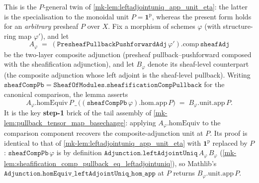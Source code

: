 \begin{lemma}\label{mk-lem:leftadjointuniq_app_unit_eta_general}
  \leanok

  This is the \(P\)-general twin of \ref{mk-lem:leftadjointuniq_app_unit_eta}: the latter is the
  specialisation to the monoidal unit \(P = \mathbf{1}^{\mathrm{p}}\), whereas the present form
  holds for an \emph{arbitrary} presheaf \(P\) over \(X\). Fix a morphism of schemes
  \(\varphi\) (with structure-ring map \(\varphi'\)), and let
  \[
    A_{\varphi}
      \;=\;
    (\mathtt{PresheafPullbackPushforwardAdj}\,\varphi').\mathrm{comp}\,\mathtt{sheafAdj}
  \]
  be the two-layer composite adjunction (presheaf pullback--pushforward composed with the
  sheafification adjunction), and let \(B_{\varphi}\) denote its sheaf-level counterpart (the
  composite adjunction whose left adjoint is the sheaf-level pullback). Writing
  \(\mathtt{sheafCompPb} = \mathtt{SheafOfModules.sheafificationCompPullback}\) for the
  canonical comparison, the lemma asserts
  \[
    A_{\varphi}.\mathrm{homEquiv}\,P\,\_\,\bigl((\mathtt{sheafCompPb}\,\varphi).\mathrm{hom}.\mathrm{app}\,P\bigr)
      \;=\;
    B_{\varphi}.\mathrm{unit}.\mathrm{app}\,P.
  \]
  It is the key \textbf{step-1} brick of the tail assembly of
  \ref{mk-lem:pullback_tensor_map_basechange}: applying \(A_{\varphi}.\mathrm{homEquiv}\) to the
  comparison component recovers the composite-adjunction unit at \(P\). Its proof is identical
  to that of \ref{mk-lem:leftadjointuniq_app_unit_eta} with \(\mathbf{1}^{\mathrm{p}}\) replaced
  by \(P\): \(\mathtt{sheafCompPb}\,\varphi\) is by definition
  \(\mathtt{Adjunction.leftAdjointUniq}\,A_{\varphi}\,B_{\varphi}\)
  (\ref{mk-lem:sheafification_comp_pullback_eq_leftadjointuniq}), so Mathlib's
  \(\mathtt{Adjunction.homEquiv\_leftAdjointUniq\_hom\_app}\) at \(P\) returns
  \(B_{\varphi}.\mathrm{unit}.\mathrm{app}\,P\).
\end{lemma}

